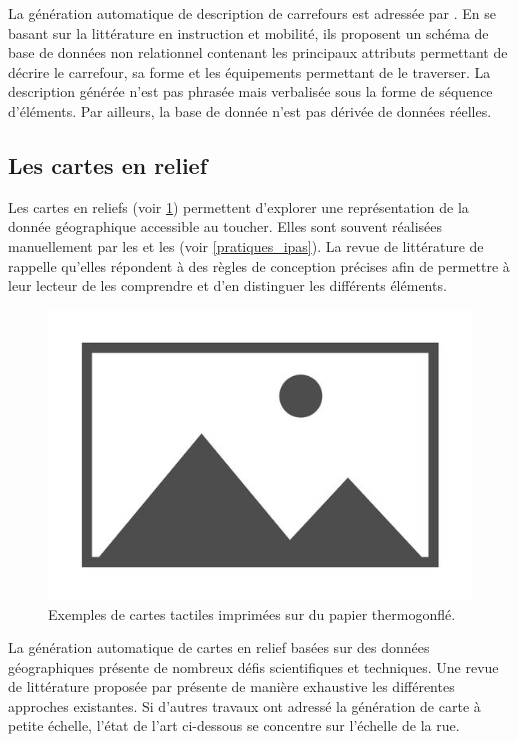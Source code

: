 La génération automatique de description de carrefours est adressée par \cite{Guth2019}. En se basant sur la littérature en instruction et mobilité, ils proposent un schéma de base de données non relationnel contenant les principaux attributs permettant de décrire le carrefour, sa forme et les équipements permettant de le traverser. La description générée n'est pas phrasée mais verbalisée sous la forme de séquence d'éléments. Par ailleurs, la base de donnée n'est pas dérivée de données réelles.

\subsection{Les cartes en relief}

Les cartes en reliefs (voir \ref{fig:excartestactiles}) permettent d'explorer une représentation de la donnée géographique accessible au toucher. Elles sont souvent réalisées manuellement par les \ipas{} et les \adts{} (voir \ref{pratiques_ipas}). La revue de littérature de \cite{Wabinski2022} rappelle qu'elles répondent à des règles de conception précises afin de permettre à leur lecteur de les comprendre et d'en distinguer les différents éléments.

\begin{figure}
    \centering
    \includegraphics{images/placeholder.jpg}
    \caption{Exemples de cartes tactiles imprimées sur du papier thermogonflé.}
    \label{fig:excartestactiles}
\end{figure}

\newpar{}

La génération automatique de cartes en relief basées sur des données géographiques présente de nombreux défis scientifiques et techniques. Une revue de littérature proposée par \cite{Wabinski2019} présente de manière exhaustive les différentes approches existantes. Si d'autres travaux ont adressé la génération de carte à petite échelle, l'état de l'art ci-dessous se concentre sur l'échelle de la rue.


